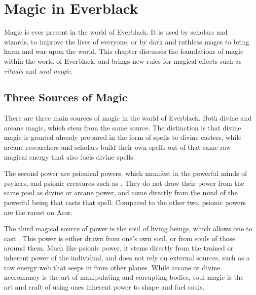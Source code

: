 \chapter{Magic in Everblack}
\label{sec:Magic}

Magic is ever present in the world of Everblack. It is used by scholars and
wizards, to improve the lives of everyone, or by dark and ruthless mages to
bring harm and war upon the world. This chapter discusses the foundations of
magic within the world of Everblack, and brings new rules for magical effects
such as \emph{rituals} and \emph{soul magic}.

\section{Three Sources of Magic}

There are three main sources of magic in the world of Everblack. Both divine
and arcane magic, which stem from the same source. The distinction is that
divine magic is granted already prepared in the form of spells to divine
casters, while arcane researchers and scholars build their own spells out of
that same raw magical energy that also fuels divine spells.

The second power are psionical powers, which manifest in the powerful minds of
psykers, and psionic creatures such as . They do not draw
their power from the same pool as divine or arcane power, and come directly
from the mind of the powerful being that casts that spell. Compared to the
other two, psionic powers are the rarest on Aror.

The third magical source of power is the soul of living beings, which allows
one to cast . This power is either drawn from one's
own soul, or from souls of those around them. Much like psionic power, it
stems directly from the trained or inherent power of the individual, and does
not rely on external sources, such as a raw energy web that seeps in from
other planes. While arcane or divine necromancy is the art of manipulating
and corrupting bodies, soul magic is the art and craft of using ones inherent
power to shape and fuel souls.













